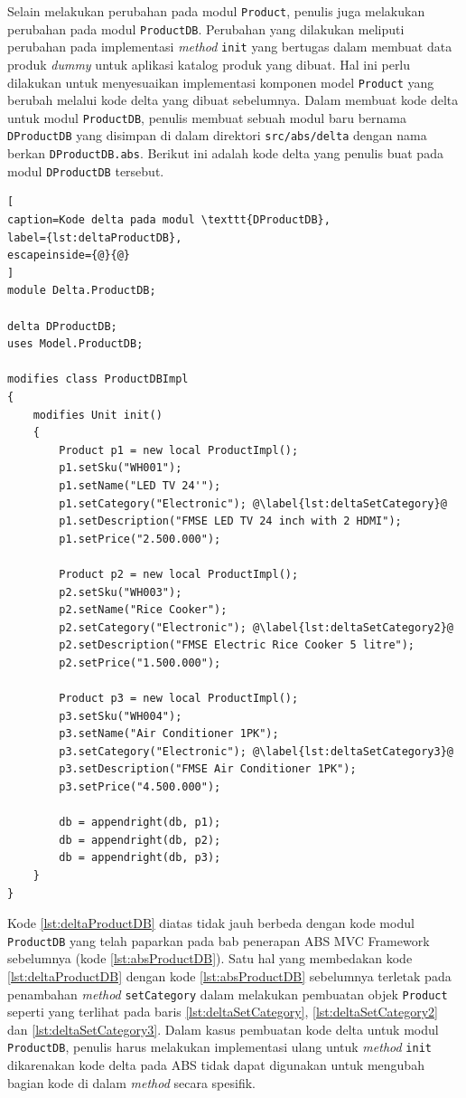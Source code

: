 Selain melakukan perubahan pada modul \texttt{Product}, penulis juga melakukan perubahan pada modul \texttt{ProductDB}. Perubahan yang dilakukan meliputi perubahan pada implementasi \textit{method} \texttt{init} yang bertugas dalam membuat data produk \textit{dummy} untuk aplikasi katalog produk yang dibuat. Hal ini perlu dilakukan untuk menyesuaikan implementasi komponen model \texttt{Product} yang berubah melalui kode delta yang dibuat sebelumnya. Dalam membuat kode delta untuk modul \texttt{ProductDB}, penulis membuat sebuah modul baru bernama \texttt{DProductDB} yang disimpan di dalam direktori \texttt{src/abs/delta} dengan nama berkan \texttt{DProductDB.abs}. Berikut ini adalah kode delta yang penulis buat pada modul \texttt{DProductDB} tersebut.

\begin{lstlisting}[
caption=Kode delta pada modul \texttt{DProductDB},
label={lst:deltaProductDB},
escapeinside={@}{@}
]
module Delta.ProductDB;

delta DProductDB;
uses Model.ProductDB;

modifies class ProductDBImpl
{
	modifies Unit init()
	{
		Product p1 = new local ProductImpl();
		p1.setSku("WH001");
		p1.setName("LED TV 24'");
		p1.setCategory("Electronic"); @\label{lst:deltaSetCategory}@
		p1.setDescription("FMSE LED TV 24 inch with 2 HDMI");
		p1.setPrice("2.500.000");

		Product p2 = new local ProductImpl();
		p2.setSku("WH003");
		p2.setName("Rice Cooker");
		p2.setCategory("Electronic"); @\label{lst:deltaSetCategory2}@
		p2.setDescription("FMSE Electric Rice Cooker 5 litre");
		p2.setPrice("1.500.000");
		
		Product p3 = new local ProductImpl();
		p3.setSku("WH004");
		p3.setName("Air Conditioner 1PK");
		p3.setCategory("Electronic"); @\label{lst:deltaSetCategory3}@
		p3.setDescription("FMSE Air Conditioner 1PK");
		p3.setPrice("4.500.000");
		
		db = appendright(db, p1);
		db = appendright(db, p2);
		db = appendright(db, p3);
	}
}
\end{lstlisting}

Kode \ref{lst:deltaProductDB} diatas tidak jauh berbeda dengan kode modul \texttt{ProductDB} yang telah paparkan pada bab penerapan ABS MVC Framework sebelumnya (kode \ref{lst:absProductDB}). Satu hal yang membedakan kode \ref{lst:deltaProductDB} dengan kode \ref{lst:absProductDB} sebelumnya terletak pada penambahan \textit{method} \texttt{setCategory} dalam melakukan pembuatan objek \texttt{Product} seperti yang terlihat pada baris \ref{lst:deltaSetCategory}, \ref{lst:deltaSetCategory2} dan \ref{lst:deltaSetCategory3}. Dalam kasus pembuatan kode delta untuk modul \texttt{ProductDB}, penulis harus melakukan implementasi ulang untuk \textit{method} \texttt{init} dikarenakan kode delta pada ABS tidak dapat digunakan untuk mengubah bagian kode di dalam \textit{method} secara spesifik.

